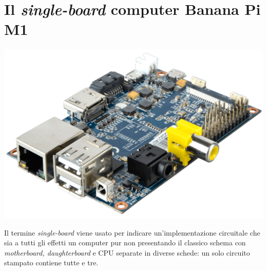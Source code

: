 \section{Il \emph{single-board} computer Banana Pi M1}
\begin{center}
\includegraphics[scale=0.175]{Figures/bananapi.png}\\
\end{center}
Il termine \emph{single-board} viene usato per indicare un'implementazione 
circuitale che sia a tutti gli effetti un computer pur non presentando il 
classico schema con \emph{motherboard, daughterboard} e CPU separate in diverse 
schede: un solo circuito stampato contiene tutte e tre. 
